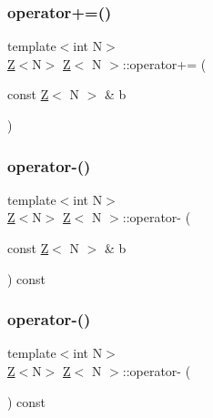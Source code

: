 \subsubsection{\texorpdfstring{operator+=()}{operator+=()}}
{\footnotesize\ttfamily template$<$int N$>$ \\
\hyperlink{classZ}{Z}$<$N$>$ \hyperlink{classZ}{Z}$<$ N $>$\+::operator+= (\begin{DoxyParamCaption}\item[{const \hyperlink{classZ}{Z}$<$ N $>$ \&}]{b }\end{DoxyParamCaption})\hspace{0.3cm}{\ttfamily [inline]}}

\mbox{\label{classZ_ac4751d1ef56abaee7ed90f29939324f2}} 
\subsubsection{\texorpdfstring{operator-\/()}{operator-()}\hspace{0.1cm}{\footnotesize\ttfamily [1/2]}}
{\footnotesize\ttfamily template$<$int N$>$ \\
\hyperlink{classZ}{Z}$<$N$>$ \hyperlink{classZ}{Z}$<$ N $>$\+::operator-\/ (\begin{DoxyParamCaption}\item[{const \hyperlink{classZ}{Z}$<$ N $>$ \&}]{b }\end{DoxyParamCaption}) const\hspace{0.3cm}{\ttfamily [inline]}}

\mbox{\label{classZ_a298e4392b981d2ce937823bb26cb7421}} 
\subsubsection{\texorpdfstring{operator-\/()}{operator-()}\hspace{0.1cm}{\footnotesize\ttfamily [2/2]}}
{\footnotesize\ttfamily template$<$int N$>$ \\
\hyperlink{classZ}{Z}$<$N$>$ \hyperlink{classZ}{Z}$<$ N $>$\+::operator-\/ (\begin{DoxyParamCaption}{ }\end{DoxyParamCaption}) const\hspace{0.3cm}{\ttfamily [inline]}}

